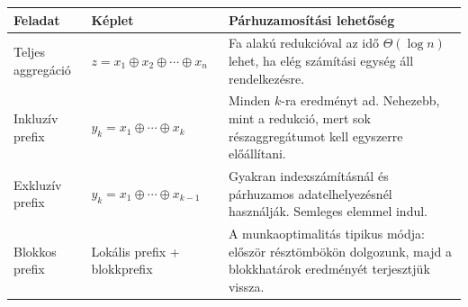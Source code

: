 \begin{tabularx}{\textwidth}{L{33mm}L{45mm}X}
\toprule
\textbf{Feladat} & \textbf{Képlet} & \textbf{Párhuzamosítási lehetőség} \\
\midrule
Teljes aggregáció & $z=x_1\oplus x_2\oplus\cdots\oplus x_n$ & Fa alakú redukcióval az idő $\Theta(\log n)$ lehet, ha elég számítási egység áll rendelkezésre. \\
Inkluzív prefix & $y_k=x_1\oplus\cdots\oplus x_k$ & Minden $k$-ra eredményt ad. Nehezebb, mint a redukció, mert sok részaggregátumot kell egyszerre előállítani. \\
Exkluzív prefix & $y_k=x_1\oplus\cdots\oplus x_{k-1}$ & Gyakran indexszámításnál és párhuzamos adatelhelyezésnél használják. Semleges elemmel indul. \\
Blokkos prefix & Lokális prefix + blokkprefix & A munkaoptimalitás tipikus módja: először résztömbökön dolgozunk, majd a blokkhatárok eredményét terjesztjük vissza. \\
\bottomrule
\end{tabularx}
